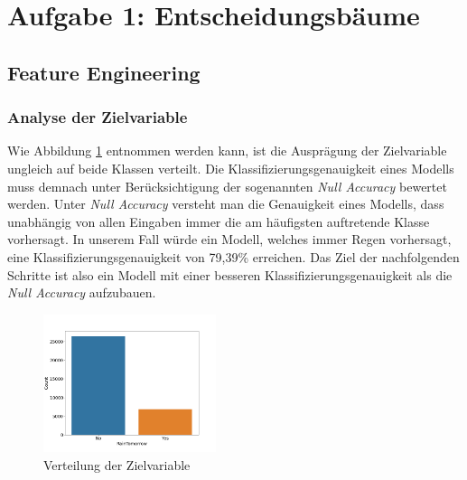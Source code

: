 \section{Aufgabe 1: Entscheidungsbäume}
\subsection{Feature Engineering}

\subsubsection{Analyse der Zielvariable}
Wie Abbildung \ref{fig:disc_target_variable} entnommen werden kann, ist die Ausprägung der Zielvariable ungleich auf beide Klassen verteilt. Die Klassifizierungsgenauigkeit eines Modells muss demnach unter Berücksichtigung der sogenannten \emph{Null Accuracy} bewertet werden. Unter \emph{Null Accuracy} versteht man die Genauigkeit eines Modells, dass unabhängig von allen Eingaben immer die am häufigsten auftretende Klasse vorhersagt. In unserem Fall würde ein Modell, welches immer Regen vorhersagt, eine Klassifizierungsgenauigkeit von 79,39\% erreichen. Das Ziel der nachfolgenden Schritte ist also ein Modell mit einer besseren Klassifizierungsgenauigkeit als die \emph{Null Accuracy} aufzubauen.


\begin{figure}[ht]
	\centering
	\vspace*{-0.9 cm}
	\includegraphics[width = 0.45\textwidth]{Bilder/distribution_target_variable.png}
	\caption{Verteilung der Zielvariable}
	\label{fig:disc_target_variable}
\end{figure}

